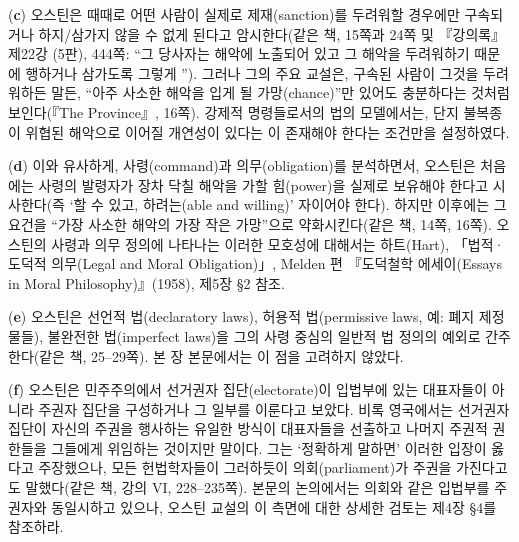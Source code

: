 {(\textbf{c})  오스틴은 때때로 어떤
사람이 실제로 제재(sanction)를 두려워할 경우에만 구속되거나 하지/삼가지
않을 수 없게 된다고 암시한다(같은 책, 15쪽과 24쪽 및 『강의록』 제22강
(5판), 444쪽: “그 당사자는 해악에 노출되어 있고 그 해악을 두려워하기
때문에 행하거나 삼가도록  그렇게 ”). 그러나 그의 주요 교설은, 구속된 사람이 그것을
두려워하든 말든, “아주 사소한 해악을 입게 될 
가망(chance)”만 있어도 충분하다는 것처럼 보인다(『The Province』,
16쪽). 강제적 명령들로서의 법의 모델에서는, 단지 불복종이 위협된
해악으로 이어질 개연성이 있다는 이 존재해야 한다는
조건만을 설정하였다.

(\textbf{d})  이와 유사하게,
사령(command)과 의무(obligation)를 분석하면서, 오스틴은 처음에는 사령의
발령자가 장차 닥칠 해악을 가할 힘(power)을 실제로 보유해야 한다고
시사한다(즉 ‘할 수 있고, 하려는(able and willing)’ 자이어야 한다).
하지만 이후에는 그 요건을 “가장 사소한 해악의 가장 작은 가망”으로
약화시킨다(같은 책, 14쪽, 16쪽). 오스틴의 사령과 의무 정의에 나타나는
이러한 모호성에 대해서는 하트(Hart), 「법적·도덕적 의무(Legal and Moral
Obligation)」, Melden 편 『도덕철학 에세이(Essays in Moral
Philosophy)』(1958), 제5장 §2 참조.

(\textbf{e})  오스틴은 선언적 법(declaratory laws),
허용적 법(permissive laws, 예: 폐지 제정물들), 불완전한 법(imperfect
laws)을 그의 사령 중심의 일반적 법 정의의 예외로 간주한다(같은 책,
25--29쪽). 본 장 본문에서는 이 점을 고려하지 않았다.

(\textbf{f})  오스틴은 민주주의에서 선거권자
집단(electorate)이 입법부에 있는 대표자들이 아니라 주권자 집단을
구성하거나 그 일부를 이룬다고 보았다. 비록 영국에서는 선거권자 집단이
자신의 주권을 행사하는 유일한 방식이 대표자들을 선출하고 나머지 주권적
권한들을 그들에게 위임하는 것이지만 말이다. 그는 ‘정확하게 말하면’
이러한 입장이 옳다고 주장했으나, 모든 헌법학자들이 그러하듯이
의회(parliament)가 주권을 가진다고도 말했다(같은 책, 강의 VI,
228--235쪽). 본문의 논의에서는 의회와 같은 입법부를 주권자와 동일시하고
있으나, 오스틴 교설의 이 측면에 대한 상세한 검토는 제4장 §4를 참조하라.

}
